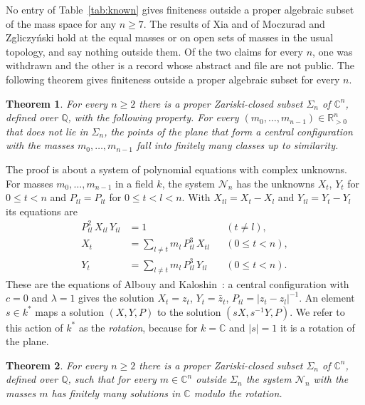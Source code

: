 \documentclass[11pt]{amsart}
\newtheorem{theorem}{Theorem}[section]
\theoremstyle{definition}
\theoremstyle{remark}
\numberwithin{equation}{section}
\newcommand{\QQ}{\mathbb{Q}}
\newcommand{\CC}{\mathbb{C}}
\newcommand{\RR}{\mathbb{R}}
\newcommand{\cN}{\mathcal{N}}
\begin{document}
No entry of Table~\ref{tab:known} gives finiteness outside a proper algebraic subset of the mass space
for any $n \ge 7$. The results of Xia and of Moczurad and Zgliczy\'nski hold at the equal masses or on
open sets of masses in the usual topology, and say nothing outside them. Of the two claims for every $n$, one was withdrawn and the other is a record whose
abstract and file are not public. The following theorem gives finiteness outside a proper algebraic
subset for every $n$.

\begin{theorem}\label{thm:main}
For every $n \ge 2$ there is a proper Zariski-closed subset $\Sigma_n$ of $\CC^n$, defined over $\QQ$,
with the following property. For every $(m_0, \dots, m_{n-1}) \in \RR_{>0}^n$ that does not lie in
$\Sigma_n$, the points of the plane that form a central configuration with the masses
$m_0, \dots, m_{n-1}$ fall into finitely many classes up to similarity.
\end{theorem}

The proof is about a system of polynomial equations with complex unknowns. For masses $m_0, \dots, m_{n-1}$ in
a field $k$, the system $\cN_n$ has the unknowns $X_t$, $Y_t$ for $0 \le t < n$ and $P_{tl} = P_{lt}$ for
$0 \le t < l < n$. With $X_{tl} = X_t - X_l$ and $Y_{tl} = Y_t - Y_l$ its equations are
\begin{align}
  P_{tl}^2\, X_{tl}\, Y_{tl} &= 1 && (t \ne l), \label{eq:N1}\\
  X_t &= \sum_{l \ne t} m_l\, P_{tl}^3\, X_{tl} && (0 \le t < n), \label{eq:N2}\\
  Y_t &= \sum_{l \ne t} m_l\, P_{tl}^3\, Y_{tl} && (0 \le t < n). \label{eq:N3}
\end{align}
These are the equations of Albouy and Kaloshin~\cite{albouykaloshin2012}: a central configuration with
$c = 0$ and $\lambda = 1$ gives the solution $X_t = z_t$, $Y_t = \bar z_t$, $P_{tl} = |z_t - z_l|^{-1}$.
An element $s \in k^{*}$ maps a solution $(X, Y, P)$ to the solution $(sX, s^{-1}Y, P)$. We refer to
this action of $k^{*}$ as the \emph{rotation}, because for $k = \CC$ and $|s| = 1$ it is a rotation of
the plane.

\begin{theorem}\label{thm:Nn}
For every $n \ge 2$ there is a proper Zariski-closed subset $\Sigma_n$ of $\CC^n$, defined over $\QQ$,
such that for every $m \in \CC^n$ outside $\Sigma_n$ the system $\cN_n$ with the masses $m$ has finitely
many solutions in $\CC$ modulo the rotation.
\end{theorem}
\end{document}
